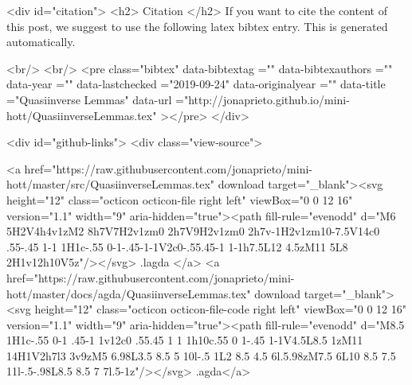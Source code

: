   
  <div id="citation">
  <h2> Citation </h2>
  If you want to cite the content of this post,
  we suggest to use the following latex bibtex entry.
  This is generated automatically.

  <br/>
  <br/>
  <pre class="bibtex"
       data-bibtextag =""
       data-bibtexauthors =""
       data-year =""
       data-lastchecked ="2019-09-24"
       data-originalyear =""
       data-title ="Quasiinverse Lemmas"
       data-url ="http://jonaprieto.github.io/mini-hott/QuasiinverseLemmas.tex"
  ></pre>
  </div>
  

  <div id="github-links">
    <div class="view-source">
      
        <a href="https://raw.githubusercontent.com/jonaprieto/mini-hott/master/src/QuasiinverseLemmas.tex" download target="_blank"><svg height="12" class="octicon octicon-file right left" viewBox="0 0 12 16" version="1.1" width="9" aria-hidden="true"><path fill-rule="evenodd" d="M6 5H2V4h4v1zM2 8h7V7H2v1zm0 2h7V9H2v1zm0 2h7v-1H2v1zm10-7.5V14c0 .55-.45 1-1 1H1c-.55 0-1-.45-1-1V2c0-.55.45-1 1-1h7.5L12 4.5zM11 5L8 2H1v12h10V5z"/></svg> .lagda </a>
        <a href="https://raw.githubusercontent.com/jonaprieto/mini-hott/master/docs/agda/QuasiinverseLemmas.tex" download target="_blank"><svg height="12" class="octicon octicon-file-code right left" viewBox="0 0 12 16" version="1.1" width="9" aria-hidden="true"><path fill-rule="evenodd" d="M8.5 1H1c-.55 0-1 .45-1 1v12c0 .55.45 1 1 1h10c.55 0 1-.45 1-1V4.5L8.5 1zM11 14H1V2h7l3 3v9zM5 6.98L3.5 8.5 5 10l-.5 1L2 8.5 4.5 6l.5.98zM7.5 6L10 8.5 7.5 11l-.5-.98L8.5 8.5 7 7l.5-1z"/></svg> .agda</a>
      
